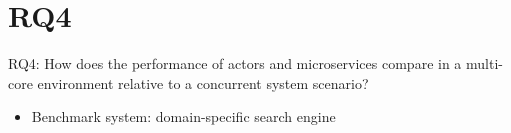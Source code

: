 \documentclass{beamer}
\begin{document}

\section{RQ4}


\begin{frame}{RQ4: How does the performance of actors and microservices compare in a multi-core environment relative to a concurrent system scenario?}

\begin{itemize}
  \item Benchmark system: domain-specific search engine
\end{itemize}

\end{frame}

\end{document}
